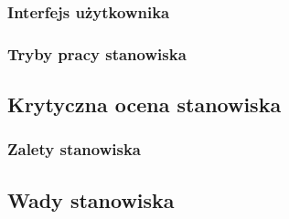 \documentclass[../main.tex]{subfiles}
\begin{document}
    \subsubsection{Interfejs użytkownika}

    \subsubsection{Tryby pracy stanowiska}

\subsection{Krytyczna ocena stanowiska} %

    \subsubsection{Zalety stanowiska}

    \subsection{Wady stanowiska}
\end{document}
